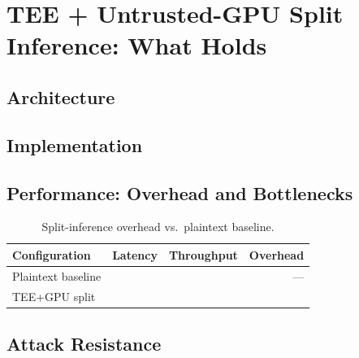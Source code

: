 \section{TEE + Untrusted-GPU Split Inference: What Holds}
\label{sec:tee}


\subsection{Architecture}

\subsection{Implementation}

\subsection{Performance: Overhead and Bottlenecks}
\begin{table}[t]
  \centering
  \caption{Split-inference overhead vs.\ plaintext baseline.}
  \label{tab:tee-overhead}
  \begin{tabular}{@{}lrrr@{}}
    \toprule
    Configuration & Latency & Throughput & Overhead \\
    \midrule
    Plaintext baseline & \needswork{} & \needswork{} & --- \\
    TEE+GPU split      & \needswork{} & \needswork{} & \needswork{} \\
    \bottomrule
  \end{tabular}
\end{table}

\subsection{Attack Resistance}

